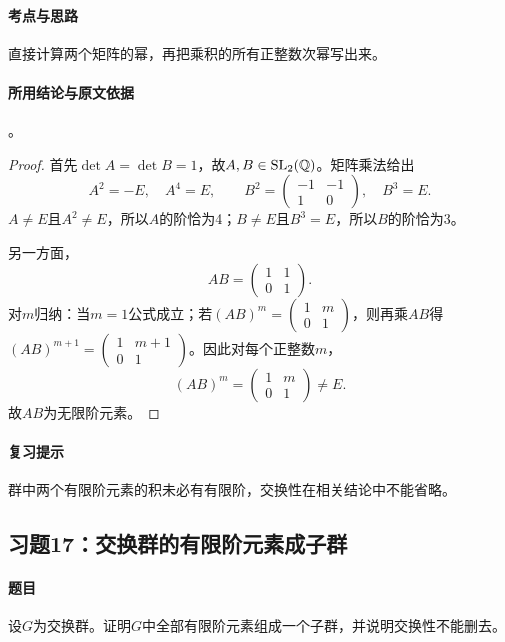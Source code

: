 \paragraph{考点与思路}
直接计算两个矩阵的幂，再把乘积的所有正整数次幂写出来。

\paragraph{所用结论与原文依据}
。


\begin{proof}
首先$\det A=\det B=1$，故$A,B\in\operatorname{SL}_2(\mathbb Q)$。矩阵乘法给出
\[
A^2=-E,\quad A^4=E,\qquad
B^2=\begin{pmatrix}-1&-1\\1&0\end{pmatrix},\quad B^3=E.
\]
$A\ne E$且$A^2\ne E$，所以$A$的阶恰为4；$B\ne E$且$B^3=E$，所以$B$的阶恰为3。

另一方面，
\[
AB=\begin{pmatrix}1&1\\0&1\end{pmatrix}.
\]
对$m$归纳：当$m=1$公式成立；若$(AB)^m=\left(\begin{smallmatrix}1&m\\0&1\end{smallmatrix}\right)$，则再乘$AB$得$(AB)^{m+1}=\left(\begin{smallmatrix}1&m+1\\0&1\end{smallmatrix}\right)$。因此对每个正整数$m$，
\[
(AB)^m=\begin{pmatrix}1&m\\0&1\end{pmatrix}\ne E.
\]
故$AB$为无限阶元素。
\end{proof}

\paragraph{复习提示}
群中两个有限阶元素的积未必有有限阶，交换性在相关结论中不能省略。


\subsection{习题17：\texorpdfstring{交换群的有限阶元素成子群}{交换群的有限阶元素成子群}}
\label{ex:1:17}

\paragraph{题目}
设$G$为交换群。证明$G$中全部有限阶元素组成一个子群，并说明交换性不能删去。

